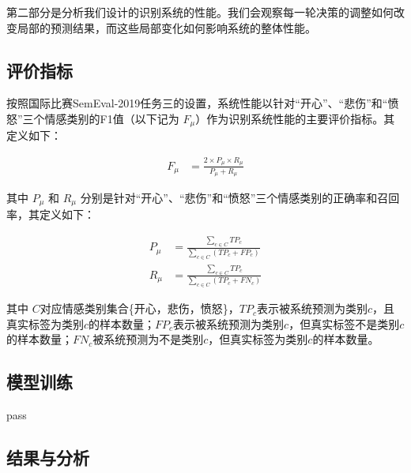 第二部分是分析我们设计的识别系统的性能。我们会观察每一轮决策的调整如何改变局部的预测结果，而这些局部变化如何影响系统的整体性能。

\subsection{评价指标}

按照国际比赛SemEval-2019任务三的设置，系统性能以针对“开心”、“悲伤”和“愤怒”三个情感类别的F1值（以下记为 $F_\mu$）作为识别系统性能的主要评价指标。其定义如下：

\begin{align}
  F_\mu &= \frac{2 \times P_\mu \times R_\mu}{P_\mu + R_\mu}
\end{align}

其中 $P_\mu$ 和 $R_\mu$ 分别是针对“开心”、“悲伤”和“愤怒”三个情感类别的正确率和召回率，其定义如下：

\begin{align}
  P_\mu &= \frac{\sum\limits_{c \in C} TP_c}{\sum\limits_{c \in C}(TP_c + FP_c)} \\
  R_\mu &= \frac{\sum\limits_{c \in C} TP_c}{\sum\limits_{c \in C}(TP_c + FN_c)}
\end{align}

其中 $C$对应情感类别集合\{开心，悲伤，愤怒\}，$TP_c$表示被系统预测为类别$c$，且真实标签为类别$c$的样本数量；$FP_c$表示被系统预测为类别$c$，但真实标签不是类别$c$的样本数量；$FN_c$被系统预测为不是类别$c$，但真实标签为类别$c$的样本数量。 



\subsection{模型训练}

pass

\subsection{结果与分析}

